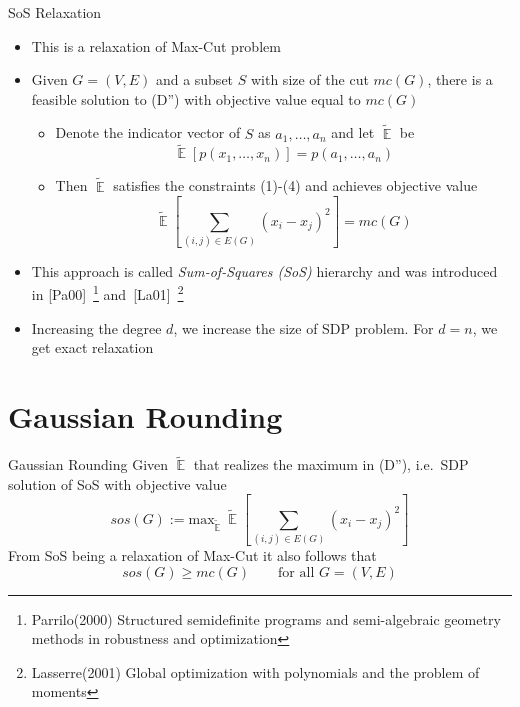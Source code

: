 \documentclass[10pt, xcolor={dvipsnames}]{beamer}
\DeclareMathOperator{\Ex}{\mathbb{E}}
\begin{document}
\begin{frame}{SoS Relaxation}
\begin{itemize}
\item This is a relaxation of Max-Cut problem
\item  Given $G= (V, E)$ and a subset $S$ with size of the cut $mc(G)$, there is a feasible solution to (D'') with objective value equal to $mc(G)$
\begin{itemize}
\item Denote the indicator vector of $S$ as $a_1, \dots, a_n$ and let $\tilde{\Ex}$ be
\begin{equation}
\tilde{\Ex}[p(x_1, \dots, x_n)] = p(a_1, \dots, a_n)
\end{equation}
\item Then $\tilde{\Ex}$ satisfies the constraints (1)-(4) and achieves objective value 
\begin{equation}
\tilde{\Ex}[ \sum_{(i, j) \in E(G)} (x_{i} - x_{j})^{2} ] = mc(G)
\end{equation}
\end{itemize}
\item This approach is called {\it Sum-of-Squares (SoS)} hierarchy and was introduced in [Pa00]~\footnote{Parrilo(2000) Structured semidefinite programs and semi-algebraic geometry methods in robustness and optimization} and~[La01]~\footnote{Lasserre(2001) Global optimization with polynomials
and the problem of moments}
\item Increasing the degree $d$, we increase the size of SDP problem. For $d = n$, we get exact relaxation
\end{itemize}
\end{frame}

\section{Gaussian Rounding}
\begin{frame}{Gaussian Rounding}
Given $\tilde{\Ex}$ that realizes the maximum in (D''), i.e.\ SDP solution of SoS with objective value
\begin{equation}
sos(G) := \text{max}_{\tilde{\Ex}} \ \tilde{\Ex}[ \sum_{(i, j) \in E(G)} (x_{i} - x_{j})^{2} ]
\end{equation}
From SoS being a relaxation of Max-Cut it also follows that
\begin{equation}
sos(G) \geq mc(G) \qquad \text{for all $G = (V, E)$}
\label{eq: upper-bound-sos}
\end{equation}
\end{frame}
\end{document}
